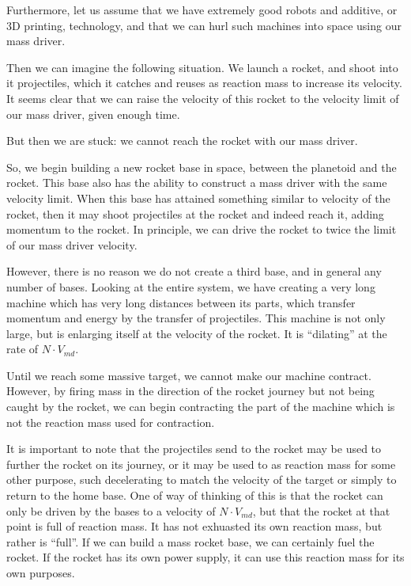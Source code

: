 \documentclass[11pt]{article}
\begin{document}
Furthermore, let us assume that we have extremely good robots and additive, or 3D printing, technology,
and that we can hurl such machines into space using our mass driver.

Then we can imagine the following situation.  We launch a rocket, and shoot into it projectiles,
which it catches and reuses as reaction mass to increase its velocity.  It seems clear that
we can raise the velocity of this rocket to the velocity limit of our mass driver, given
enough time.

But then we are stuck: we cannot reach the rocket with our mass driver.

So, we begin building a new rocket base in space, between the planetoid and the rocket.
This base also has the ability to construct a mass driver with the same velocity limit.
When this base has attained something similar to velocity of the rocket, then it
may shoot projectiles at the rocket and indeed reach it, adding momentum to the
rocket.  In principle, we can drive the rocket to twice the limit of our mass driver
velocity.

However, there is no reason we do not create a third base, and in general any number of
bases.  Looking at the entire system, we have creating a very long machine which has
very long distances between its parts, which transfer momentum and energy by the
transfer of projectiles.  This machine is not
only large, but is enlarging itself at
the velocity of the rocket.  It is ``dilating'' at the rate of $N \cdot V_{md}$.

Until we reach some massive target, we cannot make our machine contract.  However,
by firing mass in the direction of the rocket journey but not being caught by the rocket,
we can begin contracting the part of the machine which is not the reaction mass used
for contraction.

It is important to note that the projectiles send to the rocket may be used to
further the rocket on its journey, or it may be used to as reaction mass for some
other purpose, such decelerating to match the velocity of the target or simply to
return to the home base. One of way of thinking of this is that the rocket
can only be driven by the bases to a velocity of $N \cdot V_{md}$, but that the
rocket at that point is full of reaction mass.  It has not exhuasted its own
reaction mass, but rather is ``full''.  If we can build a mass rocket base,
we can certainly fuel the rocket.  If the rocket has its own power supply, it
can use this reaction mass for its own purposes.
\end{document}
